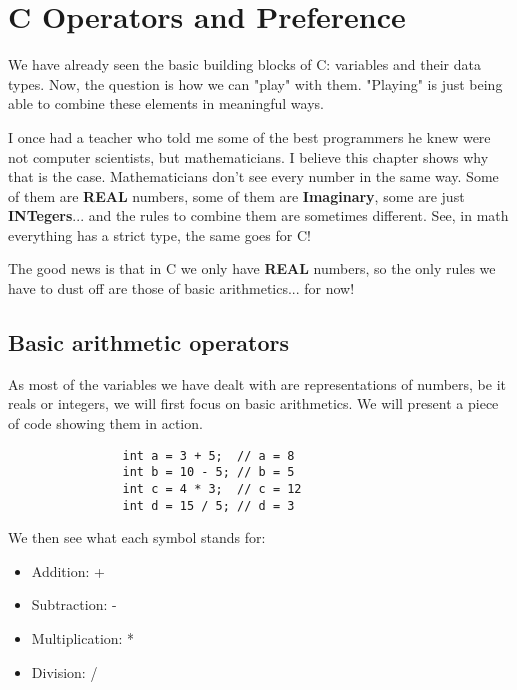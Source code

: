 \documentclass[12pt]{book}
\begin{document}
    \chapter{C Operators and Preference}

        We have already seen the basic building blocks of C: variables and their data types. Now, the question is how we can "play" with them. "Playing" is just being able to combine these elements in meaningful ways.

        I once had a teacher who told me some of the best programmers he knew were not computer scientists, but mathematicians. I believe this chapter shows why that is the case. Mathematicians don't see every number in the same way. Some of them are \textbf{REAL} numbers, some of them are \textbf{Imaginary}, some are just \textbf{INTegers}... and the rules to combine them are sometimes different. See, in math everything has a strict type, the same goes for C!

        The good news is that in C we only have \textbf{REAL} numbers, so the only rules we have to dust off are those of basic arithmetics... for now!

        \section{Basic arithmetic operators}

            As most of the variables we have dealt with are representations of numbers, be it reals or integers, we will first focus on basic arithmetics. We will present a piece of code showing them in action.

            \begin{verbatim}
                int a = 3 + 5;  // a = 8
                int b = 10 - 5; // b = 5
                int c = 4 * 3;  // c = 12
                int d = 15 / 5; // d = 3
            \end{verbatim}

            We then see what each symbol stands for:

            \begin{itemize}
                \item Addition: +
                \item Subtraction: -
                \item Multiplication: *
                \item Division: /
            \end{itemize}
\end{document}
